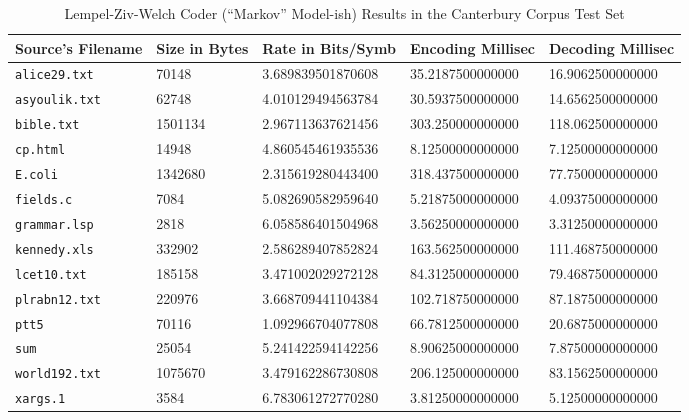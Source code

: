 \documentclass[a4paper, twocolumn]{article}
\begin{document}
    \begin{table*}[t]
        \centering
        \begin{tabular}{lllll}
        \toprule
            Source's Filename & Size in Bytes & Rate in Bits/Symb & Encoding Millisec & Decoding Millisec \\
        \midrule
            \texttt{alice29.txt}  &   70148 & 3.689839501870608 & 35.2187500000000 & 16.9062500000000 \\
            \texttt{asyoulik.txt} &   62748 & 4.010129494563784 & 30.5937500000000 & 14.6562500000000 \\
            \texttt{bible.txt}    & 1501134 & 2.967113637621456 & 303.250000000000 & 118.062500000000 \\
            \texttt{cp.html}      &   14948 & 4.860545461935536 & 8.12500000000000 & 7.12500000000000 \\
            \texttt{E.coli}       & 1342680 & 2.315619280443400 & 318.437500000000 & 77.7500000000000 \\
            \texttt{fields.c}     &    7084 & 5.082690582959640 & 5.21875000000000 & 4.09375000000000 \\
            \texttt{grammar.lsp}  &    2818 & 6.058586401504968 & 3.56250000000000 & 3.31250000000000 \\
            \texttt{kennedy.xls}  &  332902 & 2.586289407852824 & 163.562500000000 & 111.468750000000 \\
            \texttt{lcet10.txt}   &  185158 & 3.471002029272128 & 84.3125000000000 & 79.4687500000000 \\
            \texttt{plrabn12.txt} &  220976 & 3.668709441104384 & 102.718750000000 & 87.1875000000000 \\
            \texttt{ptt5}         &   70116 & 1.092966704077808 & 66.7812500000000 & 20.6875000000000 \\
            \texttt{sum}          &   25054 & 5.241422594142256 & 8.90625000000000 & 7.87500000000000 \\
            \texttt{world192.txt} & 1075670 & 3.479162286730808 & 206.125000000000 & 83.1562500000000 \\
            \texttt{xargs.1}      &    3584 & 6.783061272770280 & 3.81250000000000 & 5.12500000000000 \\
        \bottomrule
        \end{tabular}
        \caption{Lempel-Ziv-Welch Coder (``Markov'' Model-ish) Results in the Canterbury Corpus Test Set}
        \label{tab:lzw}
    \end{table*}
\end{document}
